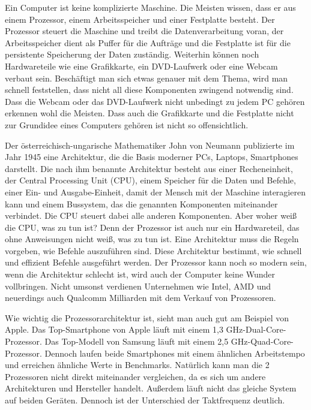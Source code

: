 Ein Computer ist keine komplizierte Maschine. Die Meisten wissen, dass er aus einem Prozessor, einem Arbeitsspeicher und einer Festplatte besteht. Der Prozessor steuert die Maschine und treibt die Datenverarbeitung voran, der Arbeitsspeicher dient als Puffer für die Aufträge und die Festplatte ist für die persistente Speicherung der Daten zuständig. Weiterhin können noch Hardwareteile wie eine Grafikkarte, ein DVD-Laufwerk oder eine Webcam verbaut sein.
Beschäftigt man sich etwas genauer mit dem Thema, wird man schnell feststellen, dass nicht all diese Komponenten zwingend notwendig sind. Dass die Webcam oder das DVD-Laufwerk nicht unbedingt zu jedem PC gehören erkennen wohl die Meisten. Dass auch die Grafikkarte und die Festplatte nicht zur Grundidee eines Computers gehören ist nicht so offensichtlich.

Der österreichisch-ungarische Mathematiker John von Neumann publizierte im Jahr 1945 eine Architektur, die die Basis moderner PCs, Laptops, Smartphones darstellt.
Die nach ihm benannte Architektur besteht aus einer Recheneinheit, der Central Processing Unit (CPU), einem Speicher für die Daten und Befehle, einer Ein- und Ausgabe-Einheit, damit der Mensch mit der Maschine interagieren kann und einem Bussystem, das die genannten Komponenten miteinander verbindet. Die CPU steuert dabei alle anderen Komponenten. Aber woher weiß die CPU, was zu tun ist? Denn der Prozessor ist auch nur ein Hardwareteil, das ohne Anweisungen nicht weiß, was zu tun ist. Eine Architektur muss die Regeln vorgeben, wie Befehle auszuführen sind. Diese Architektur bestimmt, wie schnell und effizient Befehle ausgeführt werden. Der Prozessor kann noch so modern sein, wenn die Architektur schlecht ist, wird auch der Computer keine Wunder vollbringen. Nicht umsonst verdienen Unternehmen wie Intel, AMD und neuerdings auch Qualcomm Milliarden mit dem Verkauf von Prozessoren. 

Wie wichtig die Prozessorarchitektur ist, sieht man auch gut am Beispiel von Apple. Das Top-Smartphone von Apple läuft mit einem 1,3 GHz-Dual-Core-Prozessor. Das Top-Modell von Samsung läuft mit einem 2,5 GHz-Quad-Core-Prozessor. Dennoch laufen beide Smartphones mit einem ähnlichen Arbeitstempo und erreichen ähnliche Werte in Benchmarks. Natürlich kann man die 2 Prozessoren nicht direkt miteinander vergleichen, da es sich um andere Architekturen und Hersteller handelt. Außerdem läuft nicht das gleiche System auf beiden Geräten. Dennoch ist der Unterschied der Taktfrequenz deutlich.

